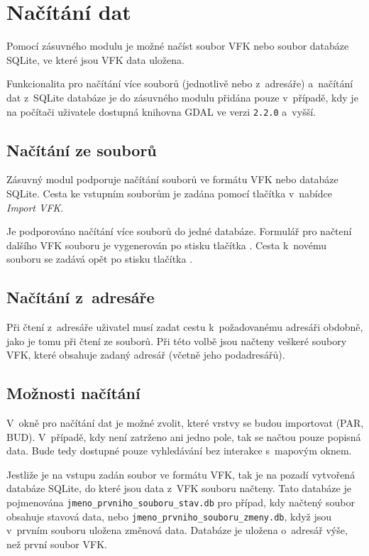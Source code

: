 \documentclass[a4paper,12pt,oneside]{book}
\begin{document}
\section{Načítání dat}
Pomocí zásuvného modulu je možné načíst soubor VFK nebo soubor
databáze SQLite, ve které jsou VFK data uložena. 

Funkcionalita pro načítání více souborů (jednotlivě nebo z~adresáře) a~načítání 
dat z~SQLite databáze je do zásuvného modulu přidána pouze v~případě, kdy je na
počítači uživatele dostupná knihovna GDAL ve verzi \texttt{2.2.0}
a~vyšší.

\subsection{Načítání ze souborů}
Zásuvný modul podporuje načítání souborů ve formátu VFK nebo databáze SQLite.
Cesta ke vstupním souborům je zadána pomocí tlačítka  v~nabídce 
\textit{Import VFK}.

Je podporováno načítání více souborů do jedné databáze. Formulář pro načtení
dalšího VFK souboru je vygenerován po stisku tlačítka \uv{+}. Cesta
k~novému souboru se zadává opět po stisku tlačítka .

\subsection{Načítání z~adresáře}
Při čtení z~adresáře uživatel musí zadat cestu k~požadovanému adresáři
obdobně, jako je tomu při čtení ze souborů. Při této volbě jsou načteny
veškeré soubory VFK, které obsahuje zadaný adresář (včetně jeho podadresářů).

\subsection{Možnosti načítání}
V~okně pro načítání dat je možné zvolit, které vrstvy se budou importovat
(PAR, BUD). V~případě, kdy není zatrženo ani jedno pole, tak se načtou
pouze popisná data. Bude tedy dostupné pouze vyhledávání bez interakce
s~mapovým oknem.

Jestliže je na vstupu zadán soubor ve formátu VFK, tak je na
pozadí vytvořená databáze SQLite, do které jsou data z~VFK souboru
načteny. Tato databáze je pojmenována
\texttt{jmeno\_prvniho\_souboru\_stav.db} pro případ, kdy načtený
soubor obsahuje stavová data, nebo
\texttt{jmeno\_prvniho\_souboru\_zmeny.db}, když jsou v~prvním souboru
uložena změnová data. Databáze je uložena o~adresář výše, než první
soubor VFK.
\end{document}
